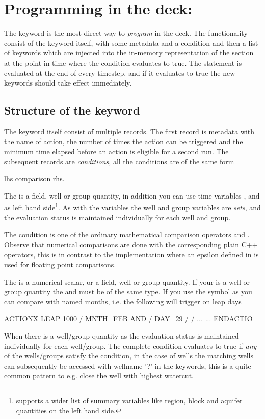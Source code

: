 \newcommand{\actionx}{}
\chapter{Programming in the deck: \actionx}
\label{actionx}
The \actionx{} keyword is the most direct way to \emph{program} in the deck. The
\actionx{} functionality consist of the \actionx{} keyword itself, with some
metadata and a condition and then a list of keywords which are injected into the
in-memory representation of the  section at the point in time where
the condition evaluates to true. The \actionx{} statement is evaluated at the
end of every timestep, and if it evaluates to true the new keywords should take
effect immediately.

\section{Structure of the \actionx{} keyword}
The \actionx{} keyword itself consist of multiple records. The first record is
metadata with the name of action, the number of times the action can be
triggered and the minimum time elapsed before an action is eligible for a second
run. The subsequent records are \emph{conditions}, all the conditions are of the
same form
\begin{code}
  lhs comparison rhs.
\end{code}
The  is a field, well or group quantity, in addition you can
use time variables ,  and  as left hand
side\footnote{\eclipse{} supports a wider list of summary variables like region,
block and aquifer quantities on the left hand side.}. As with the \udq{}
variables the well and group variables are \emph{sets}, and the evaluation
status is maintained individually for each well and group.

The condition is one of the ordinary mathematical comparison operators
\inlinecode{>,<,=,!=, <=} and \inlinecode{>=}. Observe that numerical
comparisons are done with the corresponding plain C++ operators, this is in
contrast to the \udq{} implementation where an epsilon defined in 
is used for floating point comparisons.

The  is a numerical scalar, or a field, well or group quantity.
If your  is a well or group quantity the  and
 must be of the same type. If you use the symbol  as
 you can compare with named months, i.e. the following will
trigger on leap days
\begin{deck}
ACTIONX
  LEAP 1000 /
  MNTH=FEB AND /
  DAY=29 /
/
...
...
ENDACTIO
\end{deck}
When there is a well/group quantity as  the evaluation status is
maintained individually for each well/group. The complete condition evaluates to
true if \emph{any} of the wells/groups satisfy the condition, in the case of
wells the matching wells can subsequently be accessed with wellname '?' in the
 keywords, this is a quite common pattern to e.g. close the well
with highest watercut.

